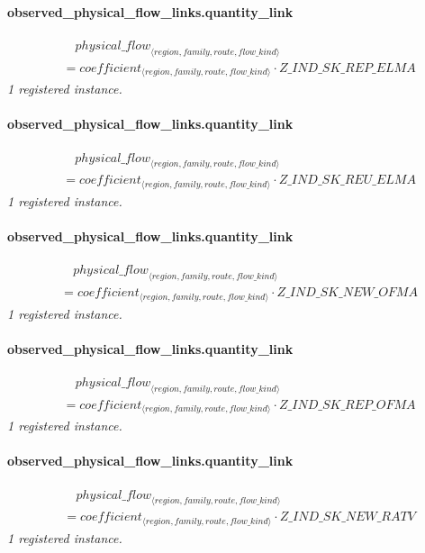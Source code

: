 \documentclass[11pt]{article}
\begin{document}
\paragraph{observed\_physical\_flow\_links.quantity\_link}
\begin{align*}
&\quad {physical\_flow}_{\langle region, family, route, flow\_kind\rangle}\\
&= coefficient_{\langle region, family, route, flow\_kind\rangle} \cdot Z\_IND\_SK\_REP\_ELMA
\end{align*}
\noindent\emph{1 registered instance.}\par
\paragraph{observed\_physical\_flow\_links.quantity\_link}
\begin{align*}
&\quad {physical\_flow}_{\langle region, family, route, flow\_kind\rangle}\\
&= coefficient_{\langle region, family, route, flow\_kind\rangle} \cdot Z\_IND\_SK\_REU\_ELMA
\end{align*}
\noindent\emph{1 registered instance.}\par
\paragraph{observed\_physical\_flow\_links.quantity\_link}
\begin{align*}
&\quad {physical\_flow}_{\langle region, family, route, flow\_kind\rangle}\\
&= coefficient_{\langle region, family, route, flow\_kind\rangle} \cdot Z\_IND\_SK\_NEW\_OFMA
\end{align*}
\noindent\emph{1 registered instance.}\par
\paragraph{observed\_physical\_flow\_links.quantity\_link}
\begin{align*}
&\quad {physical\_flow}_{\langle region, family, route, flow\_kind\rangle}\\
&= coefficient_{\langle region, family, route, flow\_kind\rangle} \cdot Z\_IND\_SK\_REP\_OFMA
\end{align*}
\noindent\emph{1 registered instance.}\par
\paragraph{observed\_physical\_flow\_links.quantity\_link}
\begin{align*}
&\quad {physical\_flow}_{\langle region, family, route, flow\_kind\rangle}\\
&= coefficient_{\langle region, family, route, flow\_kind\rangle} \cdot Z\_IND\_SK\_NEW\_RATV
\end{align*}
\noindent\emph{1 registered instance.}\par
\end{document}
